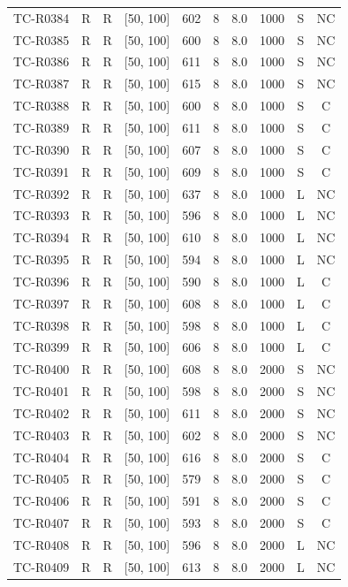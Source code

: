 \begin{longtable}{lccccccccc}
TC-R0384 & R & R & [50, 100] & 602 & 8 & 8.0 & 1000 & S & NC \\
TC-R0385 & R & R & [50, 100] & 600 & 8 & 8.0 & 1000 & S & NC \\
TC-R0386 & R & R & [50, 100] & 611 & 8 & 8.0 & 1000 & S & NC \\
TC-R0387 & R & R & [50, 100] & 615 & 8 & 8.0 & 1000 & S & NC \\
TC-R0388 & R & R & [50, 100] & 600 & 8 & 8.0 & 1000 & S & C \\
TC-R0389 & R & R & [50, 100] & 611 & 8 & 8.0 & 1000 & S & C \\
TC-R0390 & R & R & [50, 100] & 607 & 8 & 8.0 & 1000 & S & C \\
TC-R0391 & R & R & [50, 100] & 609 & 8 & 8.0 & 1000 & S & C \\
TC-R0392 & R & R & [50, 100] & 637 & 8 & 8.0 & 1000 & L & NC \\
TC-R0393 & R & R & [50, 100] & 596 & 8 & 8.0 & 1000 & L & NC \\
TC-R0394 & R & R & [50, 100] & 610 & 8 & 8.0 & 1000 & L & NC \\
TC-R0395 & R & R & [50, 100] & 594 & 8 & 8.0 & 1000 & L & NC \\
TC-R0396 & R & R & [50, 100] & 590 & 8 & 8.0 & 1000 & L & C \\
TC-R0397 & R & R & [50, 100] & 608 & 8 & 8.0 & 1000 & L & C \\
TC-R0398 & R & R & [50, 100] & 598 & 8 & 8.0 & 1000 & L & C \\
TC-R0399 & R & R & [50, 100] & 606 & 8 & 8.0 & 1000 & L & C \\
TC-R0400 & R & R & [50, 100] & 608 & 8 & 8.0 & 2000 & S & NC \\
TC-R0401 & R & R & [50, 100] & 598 & 8 & 8.0 & 2000 & S & NC \\
TC-R0402 & R & R & [50, 100] & 611 & 8 & 8.0 & 2000 & S & NC \\
TC-R0403 & R & R & [50, 100] & 602 & 8 & 8.0 & 2000 & S & NC \\
TC-R0404 & R & R & [50, 100] & 616 & 8 & 8.0 & 2000 & S & C \\
TC-R0405 & R & R & [50, 100] & 579 & 8 & 8.0 & 2000 & S & C \\
TC-R0406 & R & R & [50, 100] & 591 & 8 & 8.0 & 2000 & S & C \\
TC-R0407 & R & R & [50, 100] & 593 & 8 & 8.0 & 2000 & S & C \\
TC-R0408 & R & R & [50, 100] & 596 & 8 & 8.0 & 2000 & L & NC \\
TC-R0409 & R & R & [50, 100] & 613 & 8 & 8.0 & 2000 & L & NC \\

\end{longtable}
